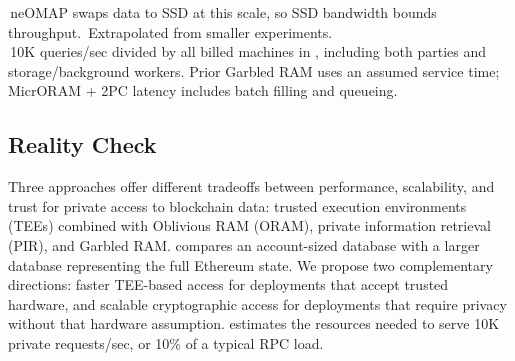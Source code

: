 \begin{table}[H]
\smallskip
\begin{minipage}{\linewidth}
\scriptsize
\tn{$\star$}\,neOMAP swaps data to SSD at this scale, so SSD bandwidth bounds throughput.
\tn{$\dagger$}\,Extrapolated from smaller experiments.\\
\tn{$\diamond$}\,10K queries/sec divided by all billed machines in
, including both parties and storage/background workers.
Prior Garbled RAM uses an assumed service time; MicrORAM + 2PC latency
includes batch filling and queueing.
\end{minipage}
\end{table}

\subsection{Reality Check}
\label{sec:comparison}

Three approaches offer different tradeoffs between performance, scalability,
and trust for private access to blockchain data: trusted execution environments
(TEEs) combined with Oblivious RAM (ORAM), private information retrieval (PIR),
and Garbled RAM.  compares an account-sized database
with a larger database representing the full Ethereum state. We propose
two complementary directions: faster TEE-based access for deployments
that accept trusted hardware, and scalable cryptographic access for
deployments that require privacy without that hardware assumption.
 estimates the resources needed to serve 10K private
requests/sec, or 10\% of a typical RPC load.

